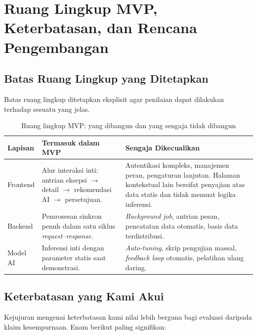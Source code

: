 \documentclass[12pt,a4paper]{article}
\begin{document}
\section{Ruang Lingkup MVP, Keterbatasan, dan Rencana Pengembangan}

\subsection{Batas Ruang Lingkup yang Ditetapkan}

Batas ruang lingkup ditetapkan eksplisit agar penilaian dapat dilakukan terhadap sesuatu yang jelas.

\begin{table}[H]
  \centering\footnotesize
  \caption{Ruang lingkup MVP: yang dibangun dan yang sengaja tidak dibangun}
  \begin{tabularx}{\textwidth}{L{2.3cm} Y Y}
    \toprule
    \textbf{Lapisan} & \textbf{Termasuk dalam MVP} & \textbf{Sengaja Dikecualikan} \\
    \midrule
    Frontend
      & Alur interaksi inti: antrian eksepsi $\rightarrow$ detail $\rightarrow$ rekomendasi AI $\rightarrow$ persetujuan.
      & Autentikasi kompleks, manajemen peran, pengaturan lanjutan. Halaman kontekstual lain bersifat penyajian atas data statis dan tidak memuat logika inferensi. \\[1.5pt]
    Backend
      & Pemrosesan sinkron penuh dalam satu siklus \textit{request--response}.
      & \textit{Background job}, antrian pesan, pencatatan data otomatis, basis data terdistribusi. \\[1.5pt]
    Model AI
      & Inferensi inti dengan parameter statis saat demonstrasi.
      & \textit{Auto-tuning}, skrip pengujian massal, \textit{feedback loop} otomatis, pelatihan ulang daring. \\
    \bottomrule
  \end{tabularx}
\end{table}

\subsection{Keterbatasan yang Kami Akui}

Kejujuran mengenai keterbatasan kami nilai lebih berguna bagi evaluasi daripada klaim kesempurnaan. Enam berikut paling signifikan:
\end{document}

